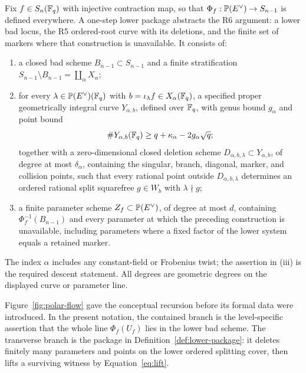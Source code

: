 \begin{definition}\label{def:lower-package}
Fix \(f\in S_n(\mathbb F_q)\) with injective contraction map, so that
\(\Phi_f:\mathbb P(E^\vee)\to S_{n-1}\) is defined everywhere.  A one-step
lower package abstracts the R6 argument: a lower bad locus, the R5
ordered-root curve with its deletions, and the finite set of markers
where that construction is unavailable.  It consists of:
\begin{enumerate}[label=\textup{(\roman*)}]
\item a closed bad scheme \(B_{n-1}\subset S_{n-1}\) and a finite
  stratification \(S_{n-1}\setminus B_{n-1}=\coprod_\alpha X_\alpha\);
\item for every
  \(\lambda\in\mathbb P(E^\vee)(\mathbb F_q)\) with
  \(b=\iota_\lambda f\in X_\alpha(\mathbb F_q)\), a specified proper
  geometrically integral curve \(Y_{\alpha,b}\), defined over
  \(\mathbb F_q\), with genus bound \(g_\alpha\) and point bound
  \[
       \#Y_{\alpha,b}(\mathbb F_q)\geq
       q+\kappa_\alpha-2g_\alpha\sqrt q;
  \]
  together with a zero-dimensional closed deletion scheme
  \(D_{\alpha,b,\lambda}\subset Y_{\alpha,b}\), of degree at most
  \(\delta_\alpha\), containing the singular, branch, diagonal,
  marker, and collision points, such that every
  rational point outside \(D_{\alpha,b,\lambda}\) determines an
  ordered rational split squarefree \(g\in W_b\) with
  \(\lambda\nmid g\);
\item a finite parameter scheme \(Z_f\subset\mathbb P(E^\vee)\), of degree
  at most \(d\), containing
  \(\Phi_f^{-1}(B_{n-1})\) and every parameter at which the preceding
  construction is unavailable, including parameters where a fixed
  factor of the lower system equals a retained marker.
\end{enumerate}
The index \(\alpha\) includes any constant-field or Frobenius twist;
the assertion in (iii) is the required descent statement.  All degrees
are geometric degrees on the displayed curve or parameter line.
\end{definition}

Figure~\ref{fig:polar-flow} gave the conceptual recursion before its formal
data were introduced.  In the present notation, the contained branch is the
level-specific assertion that the whole line \(\Phi_f(U_f)\) lies in the
lower bad scheme.  The transverse branch is the package in
Definition~\ref{def:lower-package}: it deletes finitely many parameters and
points on the lower ordered splitting cover, then lifts a surviving witness
by Equation~\eqref{eq:lift}.

